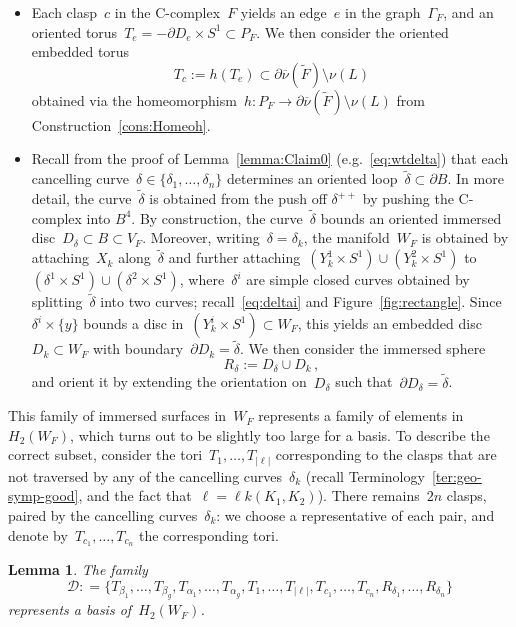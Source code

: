 \documentclass[10.9pt,a4paper]{amsart}
\newtheorem{lemma}[theorem]{Lemma}
\theoremstyle{definition}
\theoremstyle{remark}
\newcommand{\lk}{\ell k}
\newcommand{\onu}{\overline{\nu}}
\begin{document}
\begin{itemize}
\item
Each clasp~$c$ in the C-complex~$F$ yields an edge~$e$ in the graph~$\Gamma_F$, and an oriented torus~$T_e=-\partial D_e \times S^1 \subset P_F$. 
We then consider the oriented embedded torus
\[
T_c:=h(T_e)\subset \partial\onu(\tilde{F}) \setminus \nu(L)
\]
obtained via the homeomorphism~$h\colon P_F \to\partial \onu(\tilde{F}) \setminus \nu(L)$ from Construction~\ref{cons:Homeoh}.
\item
Recall from the proof of Lemma~\ref{lemma:Claim0} (e.g.~\eqref{eq:wtdelta}) that each cancelling curve~$\delta\in\{\delta_1,\dots,\delta_n\}$ determines an oriented
loop~$\tilde \delta\subset\partial B$.
In more detail, the curve~$\tilde \delta$ is obtained from the push off $\delta^{++}$ by pushing the C-complex into $B^4$.
By construction, the curve~$\tilde \delta$
\color{black}
 bounds an oriented immersed disc~$D_{\delta}\subset B\subset V_F$.
Moreover, writing~$\delta=\delta_k$, the manifold~$W_F$ is obtained by attaching~$X_{k}$ along~$\tilde\delta$
and further attaching~$(Y^1_{k} \times S^1)\cup(Y^2_{k} \times S^1)$ to~$(\delta^1 \times S^1)\cup(\delta^2 \times S^1)$, where~$\delta^i$ are simple closed curves obtained by splitting~$\tilde \delta$ into two curves; recall~\eqref{eq:deltai} and Figure~\ref{fig:rectangle}.
Since~$\delta^i \times \{y\}$ bounds a disc in~$(Y^i_{k}\times S^1)\subset W_F$,
this yields an embedded disc~$D_k\subset W_F$ with boundary~$\partial D_k=\tilde \delta$.
We then consider the immersed sphere
\[
R_{\delta} := D_{\delta} \cup D_{k}\,,
\]
and orient it by extending the orientation on~$D_{\delta}$ such that~$\partial D_{\delta}=\tilde \delta$.
\end{itemize}

This family of immersed surfaces in~$W_F$ represents a family of elements in~$H_2(W_F)$, which turns out to be slightly
too large for a basis.
To describe the correct subset, consider the tori~$T_1,\dots,T_{\vert\ell\vert}$ corresponding to the clasps that are not traversed by
any of the cancelling curves~$\delta_k$ (recall Terminology~\ref{ter:geo-symp-good}, and the fact that~$\ell=\lk(K_1,K_2)$).
There remains~$2n$ clasps, paired by the cancelling curves~$\delta_k$: we choose a representative of each pair, and denote by~$T_{c_1},\dots,T_{c_n}$ the corresponding tori. 

\begin{lemma}
\label{lemma:Basis}
The family
\[
\mathcal {D} : = \{T_{\beta_1}, \ldots, T_{\beta_{g}}, T_{\alpha_1}, \ldots, T_{\alpha_{g}}, T_1, \ldots, T_{\vert\ell\vert}, T_{c_1}, \ldots, T_{c_n}, R_{\delta_1}, \ldots, R_{\delta_n}\}
\]
represents a basis of~$H_2(W_F)$.
\end{lemma}
\end{document}

